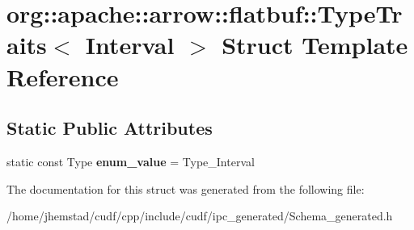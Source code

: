 \hypertarget{structorg_1_1apache_1_1arrow_1_1flatbuf_1_1TypeTraits_3_01Interval_01_4}{}\section{org\+:\+:apache\+:\+:arrow\+:\+:flatbuf\+:\+:Type\+Traits$<$ Interval $>$ Struct Template Reference}
\label{structorg_1_1apache_1_1arrow_1_1flatbuf_1_1TypeTraits_3_01Interval_01_4}
\subsection*{Static Public Attributes}
\begin{DoxyCompactItemize}
\item 
static const Type {\bfseries enum\+\_\+value} = Type\+\_\+\+Interval\hypertarget{structorg_1_1apache_1_1arrow_1_1flatbuf_1_1TypeTraits_3_01Interval_01_4_a2b9c29e2769161afdea48fdb48c7a031}{}\label{structorg_1_1apache_1_1arrow_1_1flatbuf_1_1TypeTraits_3_01Interval_01_4_a2b9c29e2769161afdea48fdb48c7a031}

\end{DoxyCompactItemize}


The documentation for this struct was generated from the following file\+:\begin{DoxyCompactItemize}
\item 
/home/jhemstad/cudf/cpp/include/cudf/ipc\+\_\+generated/Schema\+\_\+generated.\+h\end{DoxyCompactItemize}
